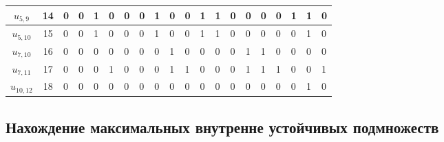 \documentclass[12pt, a4paper] {ncc}
\begin{document}
{\begin{tabularx}{\textwidth}{|c| c|X X X X X X X X X X X X X X X X X X}
$u_{5,9}$   &14  & 0 & 0 & 1  & 0  & 0  & 0 & 1  & 0  & 0  & 1  & 1  & 0  & 0  & 0  & 0  & 1  & 1   & 0 \\ \hline
$u_{5,10}$  &15  & 0 & 0 & 1  & 0  & 0  & 0 & 1  & 0  & 0  & 1  & 1  & 0  & 0  & 0  & 0  & 0  & 1   & 0 \\ \hline
$u_{7,10}$  &16  & 0 & 0 & 0  & 0  & 0  & 0 & 0  & 1  & 0  & 0  & 0  & 0  & 1  & 1  & 0  & 0  & 0   & 0 \\ \hline
$u_{7,11}$  &17  & 0 & 0 & 0  & 1  & 0  & 0 & 0  & 1  & 1  & 0  & 0  & 0  & 1  & 1  & 1  & 0  & 0   & 1 \\ \hline
$u_{10,12}$ & 18 & 0 & 0 & 0  & 0  & 0  & 0 & 0  & 0  & 0  & 0  & 0  & 0  & 0  & 0  & 0  & 0  & 1   & 0 \\ \hline
\end{tabularx}}

\subsection{Нахождение максимальных внутренне устойчивых подмножеств}
\end{document}
